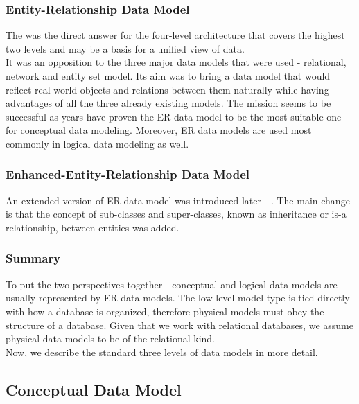 \subsubsection{Entity-Relationship Data Model}

The  was the direct answer for the four-level architecture\cite{Chen76theentity-relationship} that covers the highest two levels and may be a basis for a unified view of data. \\
It was an opposition to the three major data models that were used - relational, network and entity set model. Its aim was to bring a data model that would reflect real-world objects and relations between them naturally while having advantages of all the three already existing models. The mission seems to be successful as years have proven the ER data model to be the most suitable one for conceptual data modeling. Moreover, ER data models are used most commonly in logical data modeling as well.

\subsubsection{Enhanced-Entity-Relationship Data Model}

An extended version of ER data model was introduced later - . The main change is that the concept of sub-classes and super-classes, known as inheritance or is-a relationship, between entities was added. \\ 

\subsubsection{Summary}

To put the two perspectives together - conceptual and logical data models are usually represented by ER data models.
The low-level model type is tied directly with how a database is organized, therefore physical models must obey the structure of a database.
Given that we work with relational databases, we assume physical data models to be of the relational kind. \\

Now, we describe the standard three levels of data models in more detail.

\subsection{Conceptual Data Model}

